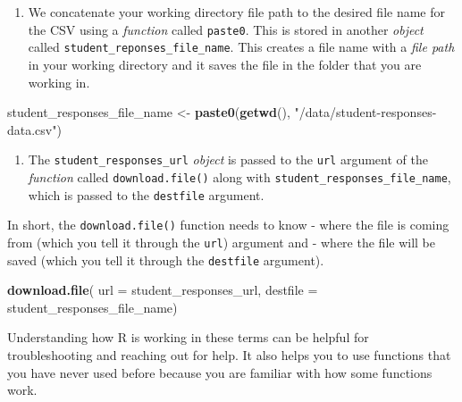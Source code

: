 \documentclass[]{book}
\newenvironment{Shaded}{\begin{snugshade}}{\end{snugshade}}
\newcommand{\KeywordTok}[1]{\textcolor[rgb]{0.13,0.29,0.53}{\textbf{#1}}}
\newcommand{\DataTypeTok}[1]{\textcolor[rgb]{0.13,0.29,0.53}{#1}}
\newcommand{\StringTok}[1]{\textcolor[rgb]{0.31,0.60,0.02}{#1}}
\newcommand{\NormalTok}[1]{#1}
\providecommand{\tightlist}{%
  \setlength{\itemsep}{0pt}\setlength{\parskip}{0pt}}
\begin{document}
\begin{enumerate}
\def\labelenumi{\arabic{enumi}.}
\setcounter{enumi}{1}
\tightlist
\item
  We concatenate your working directory file path to the desired file
  name for the CSV using a \emph{function} called \texttt{paste0}. This
  is stored in another \emph{object} called
  \texttt{student\_reponses\_file\_name}. This creates a file name with
  a \emph{file path} in your working directory and it saves the file in
  the folder that you are working in.
\end{enumerate}

\begin{Shaded}
\begin{Highlighting}[]
\NormalTok{student_responses_file_name <-}
\StringTok{    }\KeywordTok{paste0}\NormalTok{(}\KeywordTok{getwd}\NormalTok{(), }\StringTok{"/data/student-responses-data.csv"}\NormalTok{)}
\end{Highlighting}
\end{Shaded}

\begin{enumerate}
\def\labelenumi{\arabic{enumi}.}
\setcounter{enumi}{2}
\tightlist
\item
  The \texttt{student\_responses\_url} \emph{object} is passed to the
  \texttt{url} argument of the \emph{function} called
  \texttt{download.file()} along with
  \texttt{student\_responses\_file\_name}, which is passed to the
  \texttt{destfile} argument.
\end{enumerate}

In short, the \texttt{download.file()} function needs to know - where
the file is coming from (which you tell it through the \texttt{url})
argument and - where the file will be saved (which you tell it through
the \texttt{destfile} argument).

\begin{Shaded}
\begin{Highlighting}[]
\KeywordTok{download.file}\NormalTok{(}
    \DataTypeTok{url =}\NormalTok{ student_responses_url,}
    \DataTypeTok{destfile =}\NormalTok{ student_responses_file_name)}
\end{Highlighting}
\end{Shaded}

Understanding how R is working in these terms can be helpful for
troubleshooting and reaching out for help. It also helps you to use
functions that you have never used before because you are familiar with
how some functions work.
\end{document}
